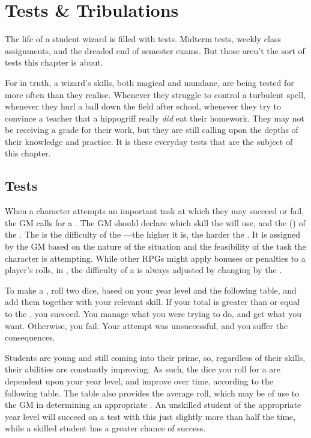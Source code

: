 \chapter{Tests \& Tribulations}


The life of a student wizard is filled with tests.
Midterm tests, weekly class assignments, and the dreaded end of semester exams.
But those aren't the sort of tests this chapter is about.

For in truth, a wizard's skills, both magical and mundane, are being tested for more often than they realise.
Whenever they struggle to control a turbulent spell,
whenever they hurl a ball down the field after school,
whenever they try to convince a teacher that a hippogriff really \emph{did} eat their homework.
They may not be receiving a grade for their work, but they are still calling upon the depths of their knowledge and practice.
It is these everyday tests that are the subject of this chapter.

\section{Tests}

When a character attempts an important task at which they may succeed or fail, the GM calls for a {\test}.
The GM should declare which skill the {\test} will use, and the {\targetnumber} ({\tn}) of the {\test}.
The {\targetnumber} is the difficulty of the {\test}---the higher it is, the harder the {\test}.
It is assigned by the GM based on the nature of the situation and the feasibility of the task the character is attempting.
While other RPGs might apply bonuses or penalties to a player's rolls, in , the difficulty of a {\test} is always adjusted by changing by the {\tn}.

To make a {\test}, roll two dice, based on your year level and the following table, and add them together with your relevant skill.
If your total is greater than or equal to the {\tn}, you succeed.
You manage what you were trying to do, and get what you want.
Otherwise, you fail.
Your attempt was unsuccessful, and you suffer the consequences.

Students are young and still coming into their prime, so, regardless of their skills, their abilities are constantly improving.
As such, the dice you roll for a {\test} are dependent upon your year level, and improve over time, according to the following table.
The table also provides the average roll, which may be of use to the GM in determining an appropriate {\tn}.
An unskilled student of the appropriate year level will succeed on a test with this {\tn} just slightly more than half the time, while a skilled student has a greater chance of success.

